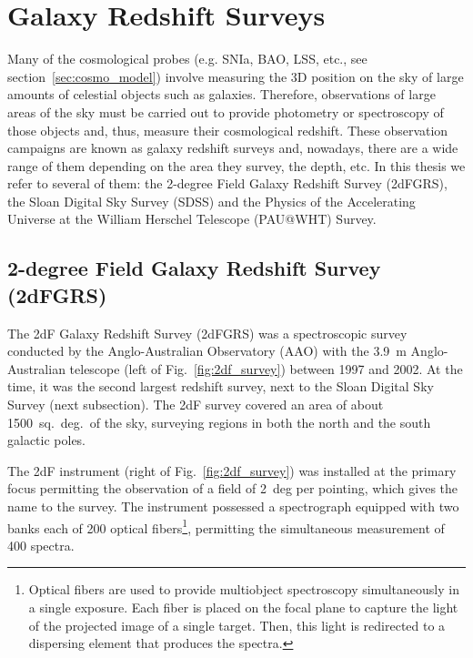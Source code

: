\section{Galaxy Redshift Surveys}
\label{sec:surveys}
Many of the cosmological probes (e.g. SNIa, BAO, LSS, etc., see section~\ref{sec:cosmo_model}) involve measuring the 3D position on the sky of large amounts of celestial objects such as galaxies. Therefore, observations of large areas of the sky must be carried out to provide photometry or spectroscopy of those objects and, thus, measure their cosmological redshift. These observation campaigns are known as galaxy redshift surveys and, nowadays, there are a wide range of them depending on the area they survey, the depth, etc. In this thesis we refer to several of them: the 2-degree Field Galaxy Redshift Survey (2dFGRS), the Sloan Digital Sky Survey (SDSS) and the Physics of the Accelerating Universe at the William Herschel Telescope (PAU@WHT) Survey.

\subsection{2-degree Field Galaxy Redshift Survey (2dFGRS)}
\label{sec:2df}
The 2dF Galaxy Redshift Survey (2dFGRS) \citep{Colless2001} was a spectroscopic survey conducted by the Anglo-Australian Observatory (AAO) with the 3.9~m Anglo-Australian telescope (left of Fig.~\ref{fig:2df_survey}) between 1997 and 2002. At the time, it was the second largest redshift survey, next to the Sloan Digital Sky Survey (next subsection). The 2dF survey covered an area of about 1500~sq.~deg.~of the sky, surveying regions in both the north and the south galactic poles.

The 2dF instrument (right of Fig.~\ref{fig:2df_survey}) was installed at the primary focus permitting the observation of a field of 2~deg per pointing, which gives the name to the survey. The instrument possessed a spectrograph equipped with two banks each of 200 optical fibers\footnote{Optical fibers are used to provide multiobject spectroscopy simultaneously in a single exposure. Each fiber is placed on the focal plane to capture the light of the projected image of a single target. Then, this light is redirected to a dispersing element that produces the spectra.}, permitting the simultaneous measurement of 400 spectra.

